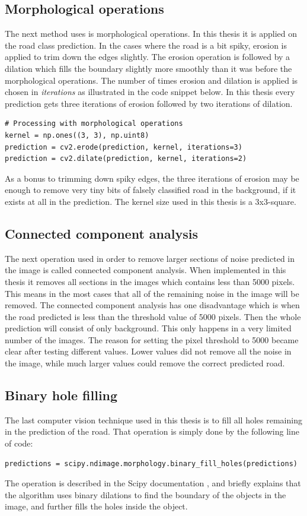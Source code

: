 \documentclass[USenglish]{ifimaster}  %
\begin{document}
\subsection{Morphological operations}
The next method uses is morphological operations. In this thesis it is applied on the road class prediction. In the cases where the road is a bit spiky, erosion is applied to trim down the edges slightly. The erosion operation is followed by a dilation which fills the boundary slightly more smoothly than it was before the morphological operations. The number of times erosion and dilation is applied is chosen in \textit{iterations} as illustrated in the code snippet below. In this thesis every prediction gets three iterations of erosion followed by two iterations of dilation.  
\begin{verbatim}
# Processing with morphological operations
kernel = np.ones((3, 3), np.uint8)
prediction = cv2.erode(prediction, kernel, iterations=3)
prediction = cv2.dilate(prediction, kernel, iterations=2)
\end{verbatim}
As a bonus to trimming down spiky edges, the three iterations of erosion may be enough to remove very tiny bits of falsely classified road in the background, if it exists at all in the prediction. The kernel size used in this thesis is a 3x3-square.

\subsection{Connected component analysis}
The next operation used in order to remove larger sections of noise predicted in the image is called connected component analysis. When implemented in this thesis it removes all sections in the images which contains less than 5000 pixels. This means in the most cases that all of the remaining noise in the image will be removed. The connected component analysis has one disadvantage which is when the road predicted is less than the threshold value of 5000 pixels. Then the whole prediction will consist of only background. This only happens in a very limited number of the images. The reason for setting the pixel threshold to 5000 became clear after testing different values. Lower values did not remove all the noise in the image, while much larger values could remove the correct predicted road. 
\subsection{Binary hole filling}
The last computer vision technique used in this thesis is to fill all holes remaining in the prediction of the road. That operation is simply done by the following line of code:
\begin{verbatim}
predictions = scipy.ndimage.morphology.binary_fill_holes(predictions)
\end{verbatim}
The operation is described in the Scipy documentation \cite{website:scipy}, and briefly explains that the algorithm uses binary dilations to find the boundary of the objects in the image, and further fills the holes inside the object.
\end{document}
